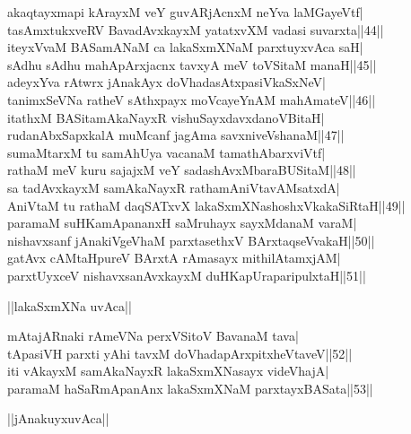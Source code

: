 \documentclass{article}
\begin{document}
akaqtayxmapi kArayxM veY guvARjAcnxM neYva laMGayeVtf|\\
tasAmxtukxveRV BavadAvxkayxM yatatxvXM vadasi suvarxta||44||\\
iteyxVvaM BASamANaM ca lakaSxmXNaM parxtuyxvAca saH|\\
sAdhu sAdhu mahApArxjacnx tavxyA meV toVSitaM manaH||45||\\
adeyxYva rAtwrx jAnakAyx doVhadasAtxpasiVkaSxNeV|\\
tanimxSeVNa ratheV sAthxpayx moVcayeYnAM mahAmateV||46||\\
itathxM BASitamAkaNayxR vishuSayxdavxdanoVBitaH|\\
rudanAbxSapxkalA muMcanf jagAma savxniveVshanaM||47||\\
sumaMtarxM tu samAhUya vacanaM tamathAbarxviVtf|\\
rathaM meV kuru sajajxM veY sadashAvxMbaraBUSitaM||48||\\
sa tadAvxkayxM samAkaNayxR rathamAniVtavAMsatxdA|\\
AniVtaM tu rathaM daqSATxvX lakaSxmXNashoshxVkakaSiRtaH||49||\\
paramaM suHKamApananxH saMruhayx sayxMdanaM varaM|\\
nishavxsanf jAnakiVgeVhaM parxtasethxV BArxtaqseVvakaH||50||\\
gatAvx cAMtaHpureV BArxtA rAmasayx mithilAtamxjAM|\\
parxtUyxceV nishavxsanAvxkayxM duHKapUraparipulxtaH||51||\\

\begin{center}
||lakaSxmXNa uvAca||
\end{center}

mAtajARnaki rAmeVNa perxVSitoV BavanaM tava|\\
tApasiVH parxti yAhi tavxM doVhadapArxpitxheVtaveV||52||\\
iti vAkayxM samAkaNayxR lakaSxmXNasayx videVhajA|\\
paramaM haSaRmApanAnx lakaSxmXNaM parxtayxBASata||53||\\

\begin{center}
||jAnakuyxuvAca||
\end{center}
\end{document}
